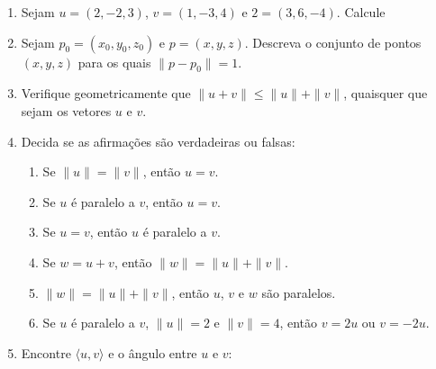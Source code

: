 \documentclass[a4paper,5pt]{amsbook}
\newcommand{\ds}{\displaystyle}
\begin{document}
\begin{enumerate}
	\vspace{0.5cm}
	\item Sejam $u=(2,-2,3)$, $v=(1,-3,4)$ e $2=(3,6,-4)$. Calcule


	\vspace{0.5cm}
	\item Sejam $p_0=(x_0,y_0,z_0)$ e $p=(x,y,z)$. Descreva o conjunto de
		pontos $(x,y,z)$ para os quais $\|p-p_0\|=1$.

	\vspace{0.5cm}
    \item Verifique geometricamente que $\|u+v\|\le\|u\|+\|v\|$, quaisquer que
        sejam os vetores $u$ e $v$.

	\vspace{0.5cm}
	\item Decida se as afirma\c{c}\~oes s\~ao verdadeiras ou falsas:
	\begin{enumerate}
		\item Se $\|u\| = \|v\|$, ent\~ao $u = v$.
		\item Se $u$ \'e paralelo a $v$, ent\~ao $u = v$.
		\item Se $u = v$, ent\~ao $u$ \'e paralelo a $v$.
		\item Se $w = u + v$, ent\~ao $\|w\| = \|u\| + \|v\|$.
		\item $\|w\| = \|u\| + \|v\|$, ent\~ao $u$, $v$ e $w$ s\~ao paralelos.
		\item Se $u$ \'e paralelo a $v$, $\|u\| = 2$ e $\|v\| = 4$, ent\~ao $v = 2u$ ou $v = -2u$.
	\end{enumerate}

	\vspace{0.5cm}
	\item Encontre $\langle u, v \rangle$ e o \^angulo entre $u$ e $v$:


\end{enumerate}
\end{document}
